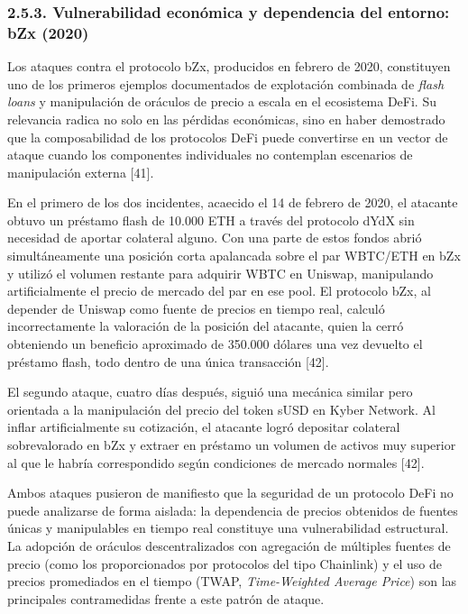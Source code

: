 \subsubsection{2.5.3. Vulnerabilidad económica y dependencia del
entorno: bZx
(2020)}\label{vulnerabilidad-econuxf3mica-y-dependencia-del-entorno-bzx-2020}

Los ataques contra el protocolo bZx, producidos en febrero de 2020,
constituyen uno de los primeros ejemplos documentados de explotación
combinada de \emph{flash loans} y manipulación de oráculos de precio a
escala en el ecosistema DeFi. Su relevancia radica no solo en las
pérdidas económicas, sino en haber demostrado que la composabilidad de
los protocolos DeFi puede convertirse en un vector de ataque cuando los
componentes individuales no contemplan escenarios de manipulación
externa {[}41{]}.

En el primero de los dos incidentes, acaecido el 14 de febrero de 2020,
el atacante obtuvo un préstamo flash de 10.000 ETH a través del
protocolo dYdX sin necesidad de aportar colateral alguno. Con una parte
de estos fondos abrió simultáneamente una posición corta apalancada
sobre el par WBTC/ETH en bZx y utilizó el volumen restante para adquirir
WBTC en Uniswap, manipulando artificialmente el precio de mercado del
par en ese pool. El protocolo bZx, al depender de Uniswap como fuente de
precios en tiempo real, calculó incorrectamente la valoración de la
posición del atacante, quien la cerró obteniendo un beneficio aproximado
de 350.000 dólares una vez devuelto el préstamo flash, todo dentro de
una única transacción {[}42{]}.

El segundo ataque, cuatro días después, siguió una mecánica similar pero
orientada a la manipulación del precio del token sUSD en Kyber Network.
Al inflar artificialmente su cotización, el atacante logró depositar
colateral sobrevalorado en bZx y extraer en préstamo un volumen de
activos muy superior al que le habría correspondido según condiciones de
mercado normales {[}42{]}.

Ambos ataques pusieron de manifiesto que la seguridad de un protocolo
DeFi no puede analizarse de forma aislada: la dependencia de precios
obtenidos de fuentes únicas y manipulables en tiempo real constituye una
vulnerabilidad estructural. La adopción de oráculos descentralizados con
agregación de múltiples fuentes de precio (como los proporcionados por
protocolos del tipo Chainlink) y el uso de precios promediados en el
tiempo (TWAP, \emph{Time-Weighted Average Price}) son las principales
contramedidas frente a este patrón de ataque.

